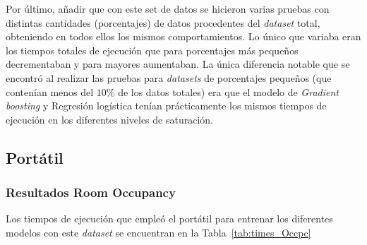 \documentclass[a4paper, 12pt]{book}
\begin{document}
Por último, añadir que con este set de datos se hicieron varias pruebas con distintas cantidades (porcentajes) de datos procedentes del \textit{dataset} total, obteniendo en todos ellos los mismos comportamientos. Lo único que variaba eran los tiempos totales de ejecución que para porcentajes más pequeños decrementaban y para mayores aumentaban. La única diferencia notable que se encontró al realizar las pruebas para \textit{datasets} de porcentajes pequeños (que contenían menos del $10\%$ de los datos totales) era que el modelo de \textit{Gradient boosting} y Regresión logística tenían prácticamente los mismos tiempos de ejecución en los diferentes niveles de saturación.

\subsection{Portátil}
\label{subsec:pc_sinteticos}

\subsubsection{Resultados Room Occupancy}
\label{subsubsec:occ_pc}

Los tiempos de ejecución que empleó el portátil para entrenar los diferentes modelos con este \textit{dataset} se encuentran en la Tabla~\ref{tab:times_Occpc}
\end{document}
